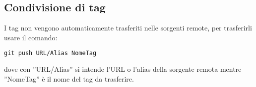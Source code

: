 \subsection{Condivisione di tag}
I tag non vengono automaticamente trasferiti nelle sorgenti remote, per trasferirli usare il comando:

\begin{center}
\texttt{git push URL/Alias NomeTag}
\end{center}

dove con ''URL/Alias'' si intende l'URL o l'alias della sorgente remota mentre ''NomeTag'' è il nome del tag da trasferire.